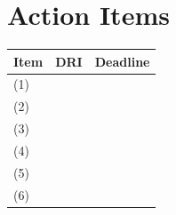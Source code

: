 \documentclass[12pt]{article}
\begin{document}
\section*{Action Items}
\renewcommand{\arraystretch}{1.75}
\begin{table}[H]
    \begin{tabular}{p{3.25in} p{1.75in} p{1in}}
        \toprule
        \textbf{Item} & \textbf{DRI\footnotemark} & \textbf{Deadline} \\
        \midrule
        (1) & & \\ \midrule
        (2) & & \\ \midrule
        (3) & & \\ \midrule
        (4) & & \\ \midrule
        (5) & & \\ \midrule
        (6) & & \\
        \bottomrule
    \end{tabular}
    \label{tab:action_items}
\end{table}

\end{document}
